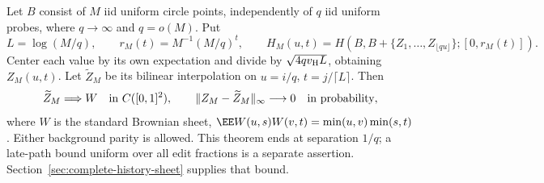 \documentclass[11pt,letterpaper]{article}
\begin{document}
\begin{theorem}
\label{thm:early-history-sheet}
Let $B$ consist of $M$ iid uniform circle points, independently
of $q$ iid uniform probes, where $q\to\infty$ and $q=o(M)$.
Put
\[
 L=\log(M/q),\qquad
 r_M(t)=M^{-1}(M/q)^t,\qquad
 H_M(u,t)=H(B,B+\{Z_1,\ldots,Z_{\lfloor qu\rfloor}\};
                                                   [0,r_M(t)]).
\]
Center each value by its own expectation and divide by
$\sqrt{4qv_{\rm H}L}$, obtaining $Z_M(u,t)$.
Let $\widetilde Z_M$ be its bilinear interpolation on
$u=i/q$, $t=j/\lceil L\rceil$. Then
\begin{equation}\label{eq:early-history-sheet}
 \widetilde Z_M\Longrightarrow W
       \quad\hbox{in }C([0,1]^2),\qquad
 \|Z_M-\widetilde Z_M\|_\infty\longrightarrow0
       \quad\hbox{in probability},
\end{equation}
where $W$ is the standard Brownian sheet,
$\EE W(u,s)W(v,t)=\min(u,v)\min(s,t)$.
Either background parity is allowed.
This theorem ends at separation $1/q$; a late-path bound
uniform over all edit fractions is a separate assertion.
Section~\ref{sec:complete-history-sheet} supplies that bound.
\end{theorem}
\end{document}
